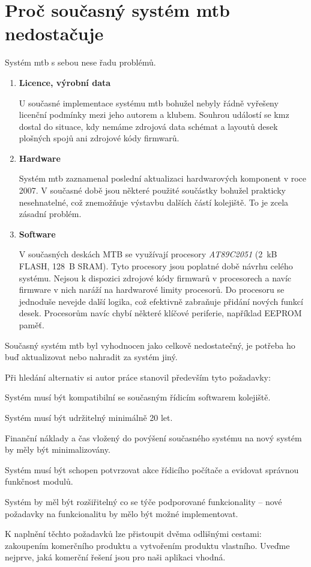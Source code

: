 \section{Proč současný systém \gls{mtb} nedostačuje} \label{sec:mtb_fail}

Systém \gls{mtb} s sebou nese řadu problémů.

\begin{enumerate}
\item \textbf{Licence, výrobní data}

U současné implementace systému \gls{mtb} bohužel nebyly řádně vyřešeny licenční
podmínky mezi jeho autorem a klubem. Souhrou událostí se \gls{kmz} dostal do
situace, kdy nemáme zdrojová data schémat a layoutů desek plošných spojů ani
zdrojové kódy firmwarů.

\item \textbf{Hardware}

Systém \gls{mtb} zaznamenal poslední aktualizaci hardwarových komponent v roce
2007. V současné době jsou některé použité součástky bohužel prakticky
nesehnatelné, což znemožňuje výstavbu dalších částí kolejiště. To je zcela
zásadní problém.

\item \textbf{Software}

V současných deskách MTB se využívají procesory \textit{AT89C2051} (2~kB FLASH,
128~B SRAM). Tyto procesory jsou poplatné době návrhu celého systému. Nejsou
k dispozici zdrojové kódy firmwarů v procesorech a navíc firmware v nich
naráží na hardwarové limity procesorů. Do procesoru se jednoduše nevejde další
logika, což efektivně zabraňuje přidání nových funkcí desek. Procesorům navíc
chybí některé klíčové periferie, například EEPROM paměť.

\end{enumerate}

Současný systém \gls{mtb} byl vyhodnocen jako celkově nedostatečný, je potřeba
ho buď aktualizovat nebo nahradit za systém jiný.

Při hledání alternativ si autor práce stanovil především tyto požadavky:

\begin{compactenum}
\item Systém musí být kompatibilní se současným řídicím softwarem kolejiště.
\item Systém musí být udržitelný minimálně 20 let.
\item Finanční náklady a čas vložený do povýšení současného systému na nový
	systém by měly být minimalizovány.
\item Systém musí být schopen potvrzovat akce řídicího počítače a evidovat správnou
	funkčnost modulů.
\item Systém by měl být rozšiřitelný co se týče podporované funkcionality –
	nové požadavky na funkcionalitu by mělo být možné implementovat.
\end{compactenum}

K naplnění těchto požadavků lze přistoupit dvěma odlišnými cestami: zakoupením
komerčního produktu a vytvořením produktu vlastního. Uveďme nejprve, jaká komerční
řešení jsou pro naši aplikaci vhodná.
